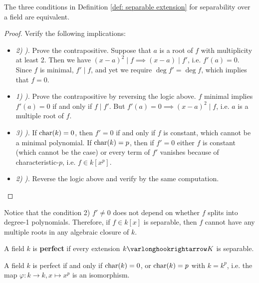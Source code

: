 \begin{proposition}
    The three conditions in Definition \ref{def: separable extension} for separability over a field are equivalent.
\end{proposition}

\begin{proof}
    Verify the following implications:
    \begin{itemize}
        \item \emph{2) ).} Prove the contrapositive. Suppose that $a$ is a root of $f$ with multiplicity at least 2. Then we have $(x - a)^2 \mid f \implies (x - a) \mid f'$, i.e. $f'(a) = 0$. Since $f$ is minimal, $f' \mid f$, and yet we require $\deg f' = \deg f$, which implies that $f = 0$.
        \item \emph{1) ).} Prove the contrapositive by reversing the logic above. $f$ minimal implies $f'(a) = 0$ if and only if $f \mid f'$. But $f'(a) = 0 \implies (x - a)^2 \mid f$, i.e. $a$ is a multiple root of $f$.
        \item \emph{3) ).} If $\mathrm{char}(k) = 0$, then $f' = 0$ if and only if $f$ is constant, which cannot be a minimal polynomial. If $\mathrm{char}(k) = p$, then if $f' = 0$ either $f$ is constant (which cannot be the case) or every term of $f'$ vanishes because of characteristic-$p$, i.e. $f \in k[x^p]$.
        \item \emph{2) ).} Reverse the logic above and verify by the same computation.
    \end{itemize}
\end{proof}

\begin{remark}
    Notice that the condition 2) $f' \neq 0$ does not depend on whether $f$ splits into degree-1 polynomials. Therefore, if $f \in k[x]$ is separable, then $f$ cannot have any multiple roots in any algebraic closure of $k$.
\end{remark}

\begin{definition}
    A field $k$ is \textbf{perfect} if every extension $k \ext K$ is separable.
\end{definition}

\begin{proposition}
    A field $k$ is perfect if and only if $\mathrm{char}(k) = 0$, or $\mathrm{char}(k) = p$ with $k = k^p$, i.e. the map $\varphi: k \to k, x \mapsto x^p$ is an isomorphism.
\end{proposition}

